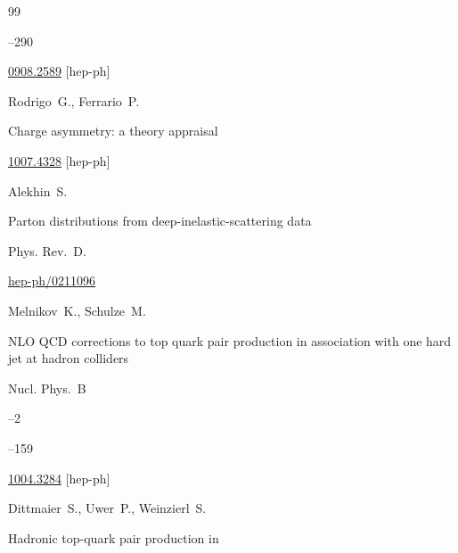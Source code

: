 \begin{thebibliography}{99}



--290

\arxiv \href{http://arxiv.org/abs/0908.2589}{0908.2589} [hep-ph]





\by Rodrigo~G., Ferrario~P.

\preprint Charge asymmetry: a theory appraisal

\arxiv \href{http://arxiv.org/abs/1007.4328}{1007.4328} [hep-ph]




\by Alekhin~S.

\paper Parton distributions from  deep-inelastic-scattering data 

\jour Phys. Rev.~D.






\arxiv \href{http://arxiv.org/abs/hep-ph/0211096}{hep-ph/0211096}







\by Melnikov~K., Schulze~M.

\paper NLO QCD corrections to top quark pair  production in association with one hard jet at hadron colliders

\jour Nucl. Phys.~B



--2

--159

\arxiv \href{http://arxiv.org/abs/1004.3284}{1004.3284} [hep-ph]





\by Dittmaier~S., Uwer~P., Weinzierl~S.

\paper Hadronic top-quark pair production in


\end{thebibliography}

